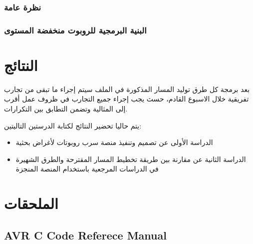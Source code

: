 \documentclass[10pt,a4paper]{book}
\begin{document}
	\subsection{نظرة عامة}
	
	
	\subsection{البنية البرمجية للروبوت منخفضة المستوى}
	
	
	
	\chapter{النتائج}
	
	بعد برمجة كل طرق توليد المسار المذكورة في الملف سيتم إجراء ما تبقى من تجارب تفريقية خلال الاسبوع القادم، حسث يجب إجراء جميع التجارب في ظروف عمل أقرب إلى المثالية وتضمن التطابق بين التكرارات. 
	
	يتم حاليا تحضير النتائج لكتابة الدرستين التاليتين:
	
	\begin{itemize}
		\item الدراسة الأولى عن تصميم وتنفيذ منصة سرب روبوتات لأغراض بحثية
		\item الدراسة الثانية عن مقارنة بين طريقة تخطيط المسار المقترحة والطرق الشهيرة في الدراسات المرجعية باستخدام المنصة المنجزة
	\end{itemize}
	
	
	
	\begin{english}
		
	\end{english}
	
	\listoffigures
	\listoftables
	\chapter{الملحقات}
	\section{AVR C Code Referece Manual}
	
	
	
\end{document}
